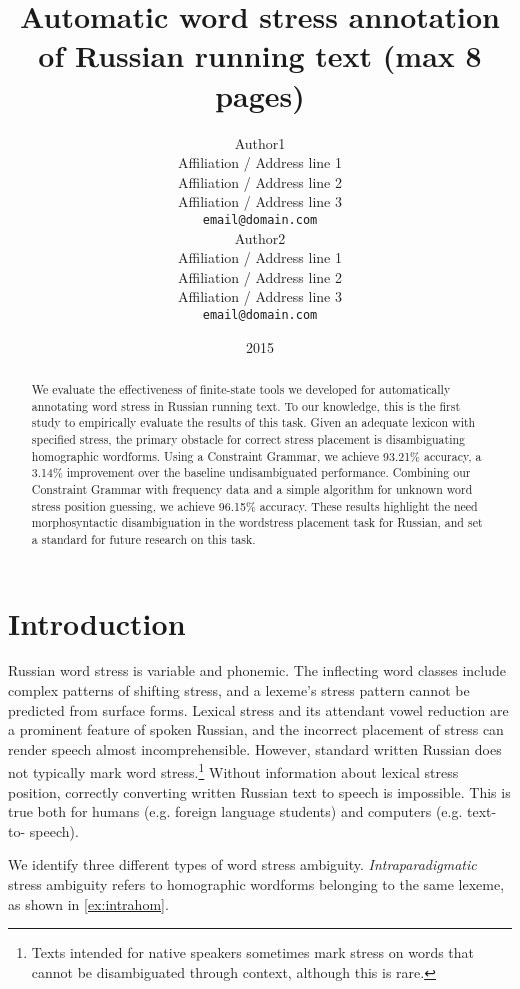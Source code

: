 \documentclass[11pt]{article}
\title{Automatic word stress annotation of Russian running text (max 8 pages)}
\author{Author1 \\
  Affiliation / Address line 1 \\
  Affiliation / Address line 2 \\
  Affiliation / Address line 3 \\
  {\tt email@domain.com} \\\And
  Author2 \\
  Affiliation / Address line 1 \\
  Affiliation / Address line 2 \\
  Affiliation / Address line 3 \\
  {\tt email@domain.com} \\}
\date{2015}
\begin{document}
\maketitle
\begin{abstract}
  We evaluate the effectiveness of finite-state tools we developed for 
  automatically annotating word stress in Russian running text. To our knowledge,
  this is the first study to empirically evaluate the results of this task. 
  Given an adequate 
  lexicon with specified stress, the primary obstacle for correct stress 
  placement is disambiguating homographic wordforms. Using a Constraint Grammar, 
  we achieve 93.21\% accuracy, a 3.14\% improvement over the baseline
  undisambiguated performance. 
  Combining our Constraint Grammar with frequency data and a simple
  algorithm for unknown word stress position guessing, we achieve 96.15\%
  accuracy. These results highlight the need morphosyntactic disambiguation
  in the wordstress placement task for Russian, and set a standard for future
  research on this task.
\end{abstract}

%

\section{Introduction}

Russian word stress is variable and phonemic. The inflecting word classes include complex 
patterns of shifting stress, and a lexeme's stress pattern cannot be predicted 
from surface forms. Lexical stress and its attendant vowel reduction are 
a prominent feature of spoken Russian, and the incorrect placement of stress
can render speech almost incomprehensible. However, standard written Russian does not 
typically mark word stress.\footnote{Texts intended for native speakers sometimes 
mark stress on words that cannot be disambiguated through context, although this 
is rare.} Without information about lexical stress position, 
correctly converting written Russian text to speech is impossible. This is true 
both for humans (e.g. foreign language students) and computers (e.g. text-to-
speech).

We identify three different types of word stress ambiguity.
\emph{Intraparadigmatic} stress ambiguity refers
to homographic wordforms belonging to the same lexeme, as shown in 
\ref{ex:intrahom}. 
\end{document}
